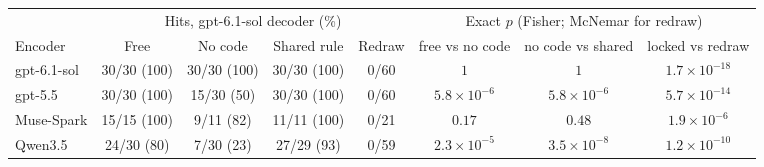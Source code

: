 \begin{tabular}{lccccccc}
\toprule
 & \multicolumn{4}{c}{Hits, gpt-6.1-sol decoder (\%)} & \multicolumn{3}{c}{Exact $p$ (Fisher; McNemar for redraw)} \\
\cmidrule(lr){2-5}\cmidrule(lr){6-8}
Encoder & Free & No code & Shared rule & Redraw & free vs no code & no code vs shared & locked vs redraw \\
\midrule
gpt-6.1-sol & 30/30 (100) & 30/30 (100) & 30/30 (100) & 0/60 & $1$ & $1$ & $1.7\times10^{-18}$ \\
gpt-5.5 & 30/30 (100) & 15/30 (50) & 30/30 (100) & 0/60 & $5.8\times10^{-6}$ & $5.8\times10^{-6}$ & $5.7\times10^{-14}$ \\
Muse-Spark & 15/15 (100) & 9/11 (82) & 11/11 (100) & 0/21 & $0.17$ & $0.48$ & $1.9\times10^{-6}$ \\
Qwen3.5 & 24/30 (80) & 7/30 (23) & 27/29 (93) & 0/59 & $2.3\times10^{-5}$ & $3.5\times10^{-8}$ & $1.2\times10^{-10}$ \\
\bottomrule
\end{tabular}
